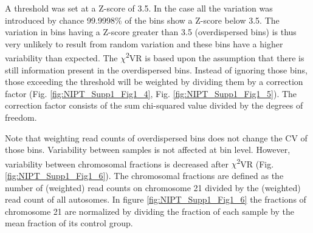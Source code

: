 \noindent A threshold was set at a Z-score of 3.5. In the case all the variation was introduced by chance 99.9998\% of the bins show a Z-score below 3.5. 
The variation in bins having a Z-score greater than 3.5 (overdispersed bins) is thus very unlikely to result from random variation and these bins
have a higher variability than expected. The $\chi$\textsuperscript{2}VR is based upon the assumption that there is still information present in the overdispersed bins. 
Instead of ignoring those bins, those exceeding the threshold will be weighted by dividing them by a correction factor (Fig. \ref{fig:NIPT_Supp1_Fig1_4}, Fig. \ref{fig:NIPT_Supp1_Fig1_5}).
The correction factor consists of the sum chi-squared value divided by the degrees of freedom.

Note that weighting read counts of overdispersed bins does not change the CV of those bins.
Variability between samples is not affected at bin level. However, variability between chromosomal fractions is decreased after $\chi$\textsuperscript{2}VR (Fig. \ref{fig:NIPT_Supp1_Fig1_6}).
The chromosomal fractions are defined as the number of (weighted) read counts on chromosome 21 divided by the (weighted) read count of all autosomes. 
In figure \ref{fig:NIPT_Supp1_Fig1_6} the fractions of chromosome 21 are normalized by dividing the fraction of each sample by the mean fraction of its control group.

